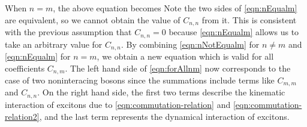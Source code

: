 When $n=m$, the above equation becomes
Note the two sides of  \autoref{eqn:nEqualm} are equivalent, so we cannot obtain the value of $C_{n,n}$ from it. 
This is consistent with the previous assumption that $C_{n,n} = 0$ because \autoref{eqn:nEqualm} allows us to take
an arbitrary value for $C_{n,n}$. 
By combining \autoref{eqn:nNotEqualm} for $n\neq m$ and \autoref{eqn:nEqualm} for $n = m$, we obtain a new 
equation 
which is valid for all coefficients $C_{n, m}$. The left hand side of \autoref{eqn:forAllnm} now corresponds to the case 
of two noninteracing bosons since the summations include terms like $C_{m,m}$ and $C_{n,n}$. On the right hand side,
 the first two terms describe the kinematic interaction of excitons due to \autoref{eqn:commutation-relation} and
 \autoref{eqn:commutation-relation2}, and the last term represents the dynamical interaction of excitons.

